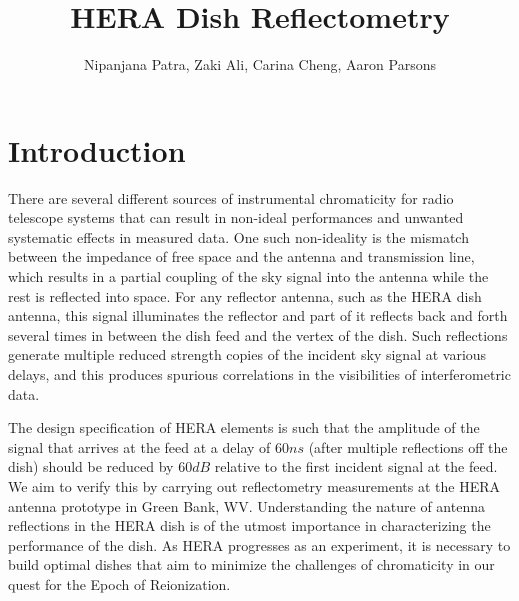 \documentclass[12pt,preprint]{aastex}
\begin{document}
\title{HERA Dish Reflectometry} 
\author{Nipanjana Patra, Zaki Ali, Carina Cheng, Aaron Parsons}
\maketitle

\section{Introduction}

There are several different sources of instrumental chromaticity for radio
telescope systems that can result in non-ideal performances and unwanted
systematic effects in measured data. One such non-ideality is the mismatch
between the impedance of free space and the antenna and transmission line,
which results in a partial coupling of the sky signal into the antenna while
the rest is reflected into space. For any reflector antenna, such as the HERA
dish antenna, this signal illuminates the reflector and part of it reflects
back and forth several times in between the dish feed and the vertex of the
dish.  Such reflections generate multiple reduced strength copies of the
incident sky signal at various delays, and this produces spurious correlations
in the visibilities of interferometric data. 

The design specification of HERA elements is such that the amplitude of the
signal that arrives at the feed at a delay of $60ns$ (after multiple
reflections off the dish) should be reduced by $60dB$ relative to the first
incident signal at the feed. We aim to verify this by carrying out reflectometry measurements at the HERA antenna prototype in Green Bank, WV.
Understanding the nature of antenna reflections in the HERA dish is of the
utmost importance in characterizing the performance of the dish. As HERA
progresses as an experiment, it is necessary to build optimal dishes that aim
to minimize the challenges of chromaticity in our quest for the Epoch of
Reionization.
\end{document}
